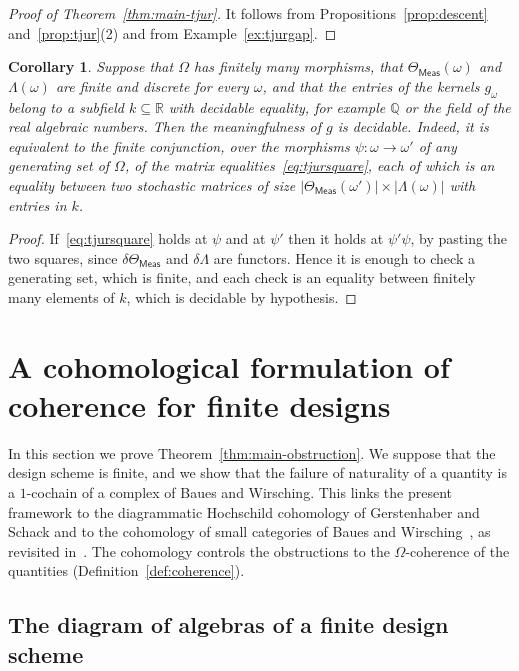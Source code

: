 \documentclass[11pt,a4paper]{article}
\theoremstyle{plain}
\newtheorem{corollary}[theorem]{Corollary}
\theoremstyle{definition}
\theoremstyle{remark}
\newcommand{\cat}[1]{\mathsf{#1}}
\newcommand{\catO}{\cat{\Omega}}
\newcommand{\Meas}{\cat{Meas}}
\newcommand{\del}{\delta}
\newcommand{\R}{\mathbb{R}}
\begin{document}
\begin{proof}[Proof of Theorem~\ref{thm:main-tjur}]
It follows from Propositions~\ref{prop:descent} and~\ref{prop:tjur}(2) and
from Example~\ref{ex:tjurgap}.
\end{proof}

\begin{corollary}\label{cor:decidable}
Suppose that $\catO$ has finitely many morphisms, that
$\Theta_\Meas(\omega)$ and $\Lambda(\omega)$ are finite and discrete for every
$\omega$, and that the entries of the kernels $g_\omega$ belong to a subfield
$k \subseteq \R$ with decidable equality, for example $\mathbb{Q}$ or the
field of the real algebraic numbers. Then the meaningfulness of $g$ is
decidable. Indeed, it is equivalent to the finite conjunction, over the
morphisms $\psi \colon \omega \to \omega'$ of any generating set of $\catO$,
of the matrix equalities~\eqref{eq:tjursquare}, each of which is an equality
between two stochastic matrices of size
$|\Theta_\Meas(\omega')| \times |\Lambda(\omega)|$ with entries in $k$.
\end{corollary}

\begin{proof}
If~\eqref{eq:tjursquare} holds at $\psi$ and at $\psi'$ then it holds at
$\psi'\psi$, by pasting the two squares, since $\del\Theta_\Meas$ and
$\del\Lambda$ are functors. Hence it is enough to check a generating set,
which is finite, and each check is an equality between finitely many elements
of $k$, which is decidable by hypothesis.
\end{proof}
\section{A cohomological formulation of coherence for finite
designs}\label{sec:hochschild}

In this section we prove Theorem~\ref{thm:main-obstruction}. We suppose that
the design scheme is finite, and we show that the failure of naturality of a
quantity is a $1$-cochain of a complex of Baues and Wirsching. This links the
present framework to the diagrammatic Hochschild cohomology of Gerstenhaber
and Schack and to the cohomology of small categories of Baues and
Wirsching~\cite{gerstenhaber_schack_1983,baues_cohomology_1985}, as revisited
in~\cite[\S3]{caputi_diagrammatic_2025}. The cohomology controls the
obstructions to the $\catO$-coherence of the quantities
(Definition~\ref{def:coherence}).

\subsection{The diagram of algebras of a finite design scheme}
\end{document}

